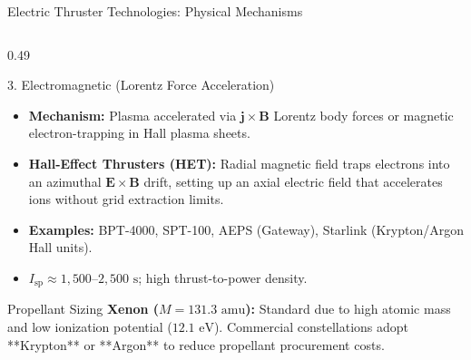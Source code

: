 \documentclass[aspectratio=169, 10pt]{beamer}
\begin{document}
\begin{frame}{Electric Thruster Technologies: Physical Mechanisms}
\begin{columns}[T]
        \begin{column}{0.49\textwidth}
            \begin{alertblock}{3. Electromagnetic (Lorentz Force Acceleration)}
                \scriptsize
                \begin{itemize}\setlength{\itemsep}{1.2pt}\setlength{\topsep}{0pt}
                    \item \textbf{Mechanism:} Plasma accelerated via $\mathbf{j} \times \mathbf{B}$ Lorentz body forces or magnetic electron-trapping in Hall plasma sheets.
                    \item \textbf{Hall-Effect Thrusters (HET):} Radial magnetic field traps electrons into an azimuthal $\mathbf{E}\times\mathbf{B}$ drift, setting up an axial electric field that accelerates ions without grid extraction limits.
                    \item \textbf{Examples:} BPT-4000, SPT-100, AEPS (Gateway), Starlink (Krypton/Argon Hall units).
                    \item $I_{\text{sp}} \approx 1{,}500\text{--}2{,}500\text{ s}$; high thrust-to-power density.
                \end{itemize}
            \end{alertblock}
            \vspace{-0.12cm}
            \begin{block}{Propellant Sizing}
                \scriptsize
                \textbf{Xenon ($M = 131.3\text{ amu}$):} Standard due to high atomic mass and low ionization potential ($12.1\text{ eV}$). Commercial constellations adopt **Krypton** or **Argon** to reduce propellant procurement costs.
            \end{block}
        \end{column}
    \end{columns}
\end{frame}
\end{document}
